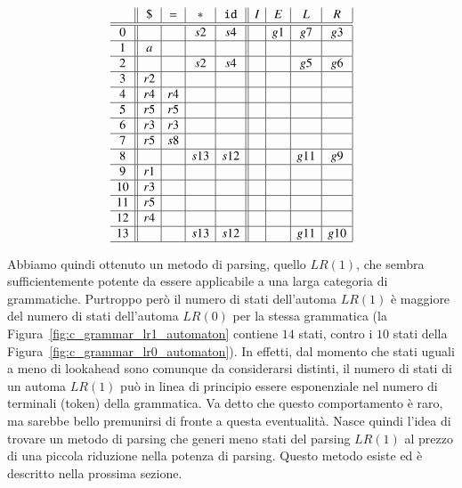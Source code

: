\[
\begin{array}{c||c|c|c|c||c|c|c|c|}
  & \mathtt{\$} & \mathtt{=} & \mathtt{*} & \mathtt{id} & I  & E  & L  & R  \\\hline\hline
0 &             &            & s2         & s4          &    & g1 & g7 & g3 \\\hline
1 & a           &            &            &             &    &    &    &    \\\hline
2 &             &            & s2         & s4          &    &    & g5 & g6 \\\hline
3 & r2          &            &            &             &    &    &    &    \\\hline
4 & r4          & r4         &            &             &    &    &    &    \\\hline
5 & r5          & r5         &            &             &    &    &    &    \\\hline
6 & r3          & r3         &            &             &    &    &    &    \\\hline
7 & r5          & s8         &            &             &    &    &    &    \\\hline
8 &             &            & s13        & s12         &    &    & g11& g9 \\\hline
9 & r1          &            &            &             &    &    &    &    \\\hline
10 & r3          &            &            &             &    &    &    &    \\\hline
11 & r5          &            &            &             &    &    &    &    \\\hline
12 & r4          &            &            &             &    &    &    &    \\\hline
13 &             &            & s13        & s12         &    &    & g11&g10 \\\hline
\end{array}
\]

Abbiamo quindi ottenuto un metodo di parsing, quello $\mathit{LR}(1)$,
che sembra sufficientemente potente da essere applicabile
a una larga categoria di grammatiche. Purtroppo per\`o il numero
di stati dell'automa $\mathit{LR}(1)$ \`e maggiore del numero di stati
dell'automa $\mathit{LR}(0)$ per la stessa grammatica
(la Figura~\ref{fig:c_grammar_lr1_automaton} contiene $14$ stati, contro
i $10$ stati della Figura~\ref{fig:c_grammar_lr0_automaton}).
In effetti, dal momento che stati uguali a meno di lookahead sono
comunque da considerarsi distinti, il numero di stati di un automa
$\mathit{LR}(1)$ pu\`o in linea di principio essere esponenziale nel
numero di terminali (token) della grammatica. Va detto che questo
comportamento \`e raro, ma sarebbe bello premunirsi di fronte a questa
eventualit\`a. Nasce quindi l'idea di trovare un metodo di parsing che
generi meno stati del parsing $\mathit{LR}(1)$ al prezzo di una piccola
riduzione nella potenza di parsing. Questo metodo esiste ed \`e descritto
nella prossima sezione.
%

